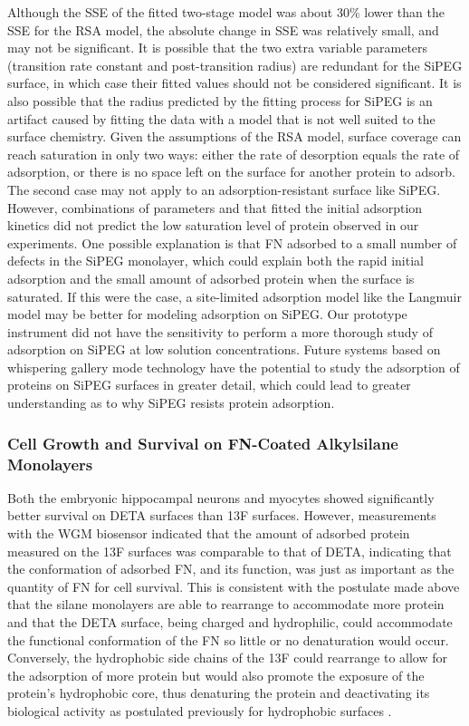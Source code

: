 Although the SSE of the fitted two-stage model was about 30\% lower
than the SSE for the RSA model, the absolute change in SSE was relatively
small, and may not be significant. It is possible that the two extra
variable parameters (transition rate constant and post-transition
radius) are redundant for the SiPEG surface, in which case their fitted
values should not be considered significant. It is also possible that
the radius predicted by the fitting process for SiPEG is an artifact
caused by fitting the data with a model that is not well suited to
the surface chemistry. Given the assumptions of the RSA model, surface
coverage can reach saturation in only two ways: either the rate of
desorption equals the rate of adsorption, or there is no space left
on the surface for another protein to adsorb. The second case may
not apply to an adsorption-resistant surface like SiPEG. However,
combinations of parameters and that fitted the initial adsorption
kinetics did not predict the low saturation level of protein observed
in our experiments. One possible explanation is that FN adsorbed to
a small number of defects in the SiPEG monolayer, which could explain
both the rapid initial adsorption and the small amount of adsorbed
protein when the surface is saturated. If this were the case, a site-limited
adsorption model like the Langmuir model may be better for modeling
adsorption on SiPEG. Our prototype instrument did not have the sensitivity
to perform a more thorough study of adsorption on SiPEG at low solution
concentrations. Future systems based on whispering gallery mode technology
have the potential to study the adsorption of proteins on SiPEG surfaces
in greater detail, which could lead to greater understanding as to
why SiPEG resists protein adsorption. 


\subsubsection{Cell Growth and Survival on FN-Coated Alkylsilane Monolayers}

Both the embryonic hippocampal neurons and myocytes showed significantly
better survival on DETA surfaces than 13F surfaces. However, measurements
with the WGM biosensor indicated that the amount of adsorbed protein
measured on the 13F surfaces was comparable to that of DETA, indicating
that the conformation of adsorbed FN, and its function, was just as
important as the quantity of FN for cell survival. This is consistent
with the postulate made above that the silane monolayers are able
to rearrange to accommodate more protein and that the DETA surface,
being charged and hydrophilic, could accommodate the functional conformation
of the FN so little or no denaturation would occur. Conversely, the
hydrophobic side chains of the 13F could rearrange to allow for the
adsorption of more protein but would also promote the exposure of
the protein's hydrophobic core, thus denaturing the protein and deactivating
its biological activity as postulated previously for hydrophobic surfaces
\cite{Keselowsky2003}. 


